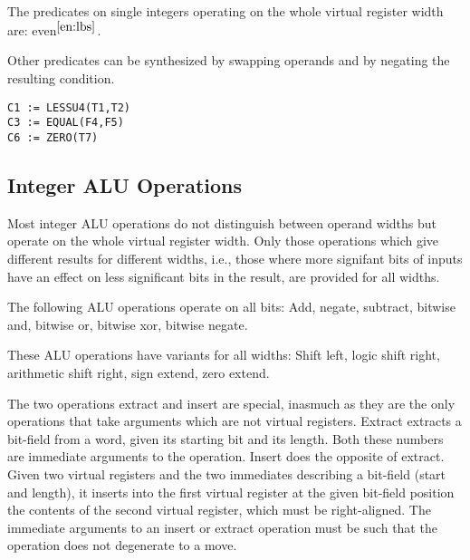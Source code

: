 \documentclass{article}
\newcommand{\enoteref}[1]{$^{\ref{#1}}$}
\begin{document}
The predicates on single integers operating on the whole virtual
register width are: even\enoteref{en:lbs}.

Other predicates can be synthesized by swapping operands and by
negating the resulting condition.

\begin{verbatim}
C1 := LESSU4(T1,T2)
C3 := EQUAL(F4,F5)
C6 := ZERO(T7)
\end{verbatim}

\subsection{Integer ALU Operations}

Most integer ALU operations do not distinguish between operand widths
but operate on the whole virtual register width.  Only those
operations which give different results for different widths, i.e.,
those where more signifant bits of inputs have an effect on less
significant bits in the result, are provided for all widths.

The following ALU operations operate on all bits: Add, negate,
subtract, bitwise and, bitwise or, bitwise xor, bitwise negate.

These ALU operations have variants for all widths: Shift
left, logic shift right,
arithmetic shift right, sign extend, zero extend.


The two operations extract and insert are special, inasmuch as they
are the only operations that take arguments which are not virtual
registers.  Extract extracts a bit-field from a word, given its
starting bit and its length.  Both these numbers are immediate
arguments to the operation.
Insert does the opposite of extract.  Given two virtual registers and
the two immediates describing a bit-field (start and length), it
inserts into the first virtual register at the given bit-field
position the contents of the second virtual register, which must be
right-aligned.  The immediate arguments to an insert or extract
operation must be such that the operation does not degenerate to a
move.
\end{document}
